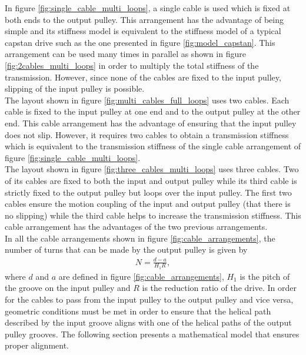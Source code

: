 \documentclass[10pt,cleanfoot]{asme2ej}
\begin{document}
In figure \ref{fig:single_cable_multi_loops}, a single cable is used which is fixed at both ends to the output pulley. This arrangement has the advantage of being simple and its stiffness model is equivalent to the stiffness model of a typical capstan drive such as the one presented in figure \ref{fig:model_capstan}. This arrangement can be used many times in parallel as shown in figure \ref{fig:2cables_multi_loops} in order to multiply the total stiffness of the transmission. However, since none of the cables are fixed to the input pulley, slipping of the input pulley is possible.\\
The layout shown in figure \ref{fig:multi_cables_full_loops} uses two cables. Each cable is fixed to the input pulley at one end and to the output pulley at the other end. This cable arrangement has the advantage of ensuring that the input pulley does not slip. However, it requires two cables to obtain a transmission stiffness which is equivalent to the transmission stiffness of the single cable arrangement of figure \ref{fig:single_cable_multi_loops}.\\
The layout shown in figure  \ref{fig:three_cables_multi_loops} uses three cables. Two of its cables are fixed to both the input and output pulley while its third cable is strictly fixed to the output pulley but loops over the input pulley. The first two cables ensure the motion coupling of the input and output pulley (that there is no slipping) while the third cable helps to increase the transmission stiffness. This cable arrangement has the advantages of the two previous arrangements. \\
In all the cable arrangements shown in figure \ref{fig:cable_arrangements}, the number of turns that can be made by the output pulley is given by 
\begin{align}
N = \frac{d-a}{H_1R},
\end{align}
where  $d$ and $a$ are defined in figure \ref{fig:cable_arrangements}, $H_1$ is the pitch of the groove on the input pulley and $R$ is the reduction ratio of the drive.
In order for the cables to pass from the input pulley to the output pulley and vice versa, geometric conditions must be met in order to ensure that the helical path described by the input groove aligns with one of the helical paths of the output pulley grooves. The following section presents a mathematical model that ensures proper alignment.
\end{document}
